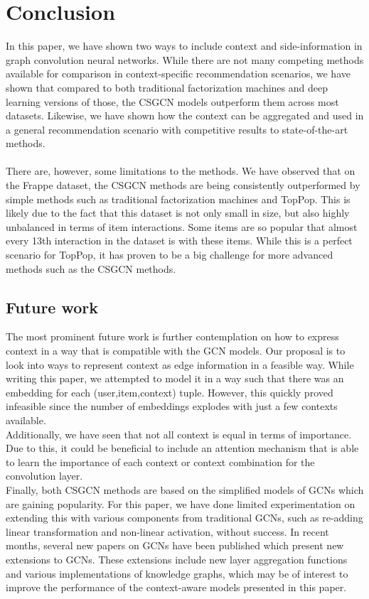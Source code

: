 \section{Conclusion}\label{sec:conclusion}
In this paper, we have shown two ways to include context and side-information in graph convolution neural networks.
While there are not many competing methods available for comparison in context-specific recommendation scenarios, we have shown that compared to both traditional factorization machines and deep learning versions of those, the CSGCN models outperform them across most datasets.
Likewise, we have shown how the context can be aggregated and used in a general recommendation scenario with competitive results to state-of-the-art methods.
\\\\
There are, however, some limitations to the methods.
We have observed that on the Frappe dataset, the CSGCN methods are being consistently outperformed by simple methods such as traditional factorization machines and TopPop.
This is likely due to the fact that this dataset is not only small in size, but also highly unbalanced in terms of item interactions.
Some items are so popular that almost every 13th interaction in the dataset is with these items.
While this is a perfect scenario for TopPop, it has proven to be a big challenge for more advanced methods such as the CSGCN methods.

\subsection{Future work}
The most prominent future work is further contemplation on how to express context in a way that is compatible with the GCN models.
Our proposal is to look into ways to represent context as edge information in a feasible way.
While writing this paper, we attempted to model it in a way such that there was an embedding for each (user,item,context) tuple.
However, this quickly proved infeasible since the number of embeddings explodes with just a few contexts available.
\\
Additionally, we have seen that not all context is equal in terms of importance.
Due to this, it could be beneficial to include an attention mechanism that is able to learn the importance of each context or context combination for the convolution layer.
\\
Finally, both CSGCN methods are based on the simplified models of GCNs which are gaining popularity.
For this paper, we have done limited experimentation on extending this with various components from traditional GCNs, such as re-adding linear transformation and non-linear activation, without success.
In recent months, several new papers on GCNs have been published which present new extensions to GCNs.
These extensions include new layer aggregation functions and various implementations of knowledge graphs, which may be of interest to improve the performance of the context-aware models presented in this paper.
